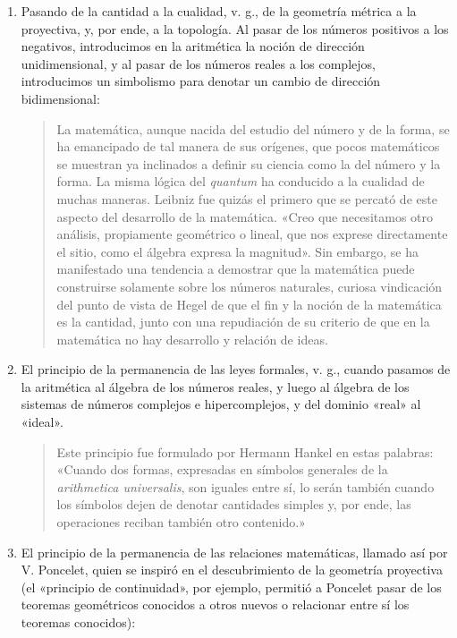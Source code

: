 \documentclass[a4paper, 12pt]{article}
\begin{document}
{{\begin{enumerate}
\item Pasando de la cantidad a la cualidad, v. g., de la geometría métrica a la
proyectiva, y, por ende, a la topología. Al pasar de los números positivos a los
negativos, introducimos en la aritmética la noción de dirección unidimensional,
y al pasar de los números reales a los complejos, introducimos un simbolismo
para denotar un cambio de dirección bidimensional:

\begin{quote}\small La matemática, aunque nacida del estudio del número y de la
forma, se ha emancipado de tal manera de sus orígenes, que pocos matemáticos se
muestran ya inclinados a definir su ciencia como la del número y la forma. La
misma lógica del \textit{quantum} ha conducido a la cualidad de muchas maneras.
Leibniz fue quizás el primero que se percató de este aspecto del desarrollo de
la matemática. «Creo que necesitamos otro análisis, propiamente geométrico o
lineal, que nos exprese directamente el sitio, como el álgebra expresa la
magnitud». Sin embargo, se ha manifestado una tendencia a demostrar que la
matemática puede construirse solamente sobre los números naturales, curiosa
vindicación del punto de vista de Hegel de que el fin y la noción de la
matemática es la cantidad, junto con una repudiación de su criterio de que en la
matemática no hay desarrollo y relación de ideas. \end{quote}

\item  El principio de la permanencia de las leyes formales, v. g., cuando
pasamos de la aritmética al álgebra de los números reales, y luego al álgebra de
los sistemas de números complejos e hipercomplejos, y del dominio «real» al
«ideal».

\begin{quote}\small Este principio fue formulado por Hermann Hankel en estas
palabras: «Cuando dos formas, expresadas en símbolos generales de la
\textit{arithmetica universalis}, son iguales entre sí, lo serán también cuando
los símbolos dejen de denotar cantidades simples y, por ende, las operaciones
reciban también otro contenido.» \end{quote}

\item  El principio de la permanencia de las relaciones matemáticas, llamado así
por V. Poncelet, quien se inspiró en el descubrimiento de la geometría
proyectiva (el «principio de continuidad», por ejemplo, permitió a Poncelet
pasar de los teoremas geométricos conocidos a otros nuevos o relacionar entre sí
los teoremas conocidos):


\end{enumerate}}}
\end{document}
